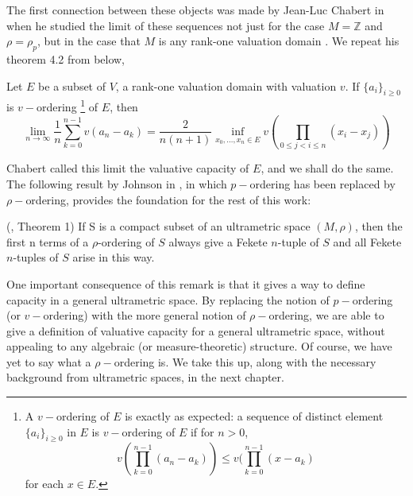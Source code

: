 The first connection between these objects was made by Jean-Luc Chabert in \cite{jlc} when he studied the limit of these sequences not just for the case $M=\mathbb{Z}$ and $\rho=\rho_p$, but in the case that $M$ is any rank-one valuation domain \cite{jlc}. We repeat his theorem 4.2 from \cite{jlc} below,

\begin{proposition}
Let $E$ be a subset of $V$, a rank-one valuation domain with valuation $v$. If $\{a_i\}_{i \geq 0}$ is $v-$ordering \footnote{A $v-$ordering of $E$ is exactly as expected: a sequence of distinct element $\{a_i\}_{i \geq 0}$ in $E$ is $v-$ordering of $E$ if for $n >0$,
\[ v(\prod_{k=0}^{n-1} (a_n-a_k) ) \leq v(\prod_{k=0}^{n-1} (x-a_k)  \] for each $x \in E$.} of $E$, then
\[\lim_{n\to\infty} \frac{1}{n} \sum_{k=0}^{n-1} v(a_n-a_k) =\frac{2}{n(n+1)} \inf_{x_0, \ldots, x_n \in E} v (\prod_{0\leq j < i \leq n} (x_i-x_j))\]
\end{proposition}

Chabert called this limit the valuative capacity of $E$, and we shall do the same. The following result by Johnson in \cite{kj}, in which $p-$ordering has been replaced by $\rho-$ordering, provides the foundation for the rest of this work:

\begin{proposition} (\cite{kj}, Theorem 1)
If S is a compact subset of an ultrametric space $(M, \rho)$, then the first n terms of a $\rho$-ordering of $S$ always give a Fekete $n$-tuple of $S$ and all Fekete $n$-tuples of $S$ arise in this way.
\end{proposition}

One important consequence of this remark is that it gives a way to define capacity in a general ultrametric space. By replacing the notion of $p-$ordering (or $v-$ordering) with the more general notion of $\rho-$ordering, we are able to give a definition of valuative capacity for a general ultrametric space, without appealing to any algebraic (or measure-theoretic) structure. Of course, we have yet to say what a $\rho-$ordering is.  We take this up, along with the necessary background from ultrametric spaces, in the next chapter.